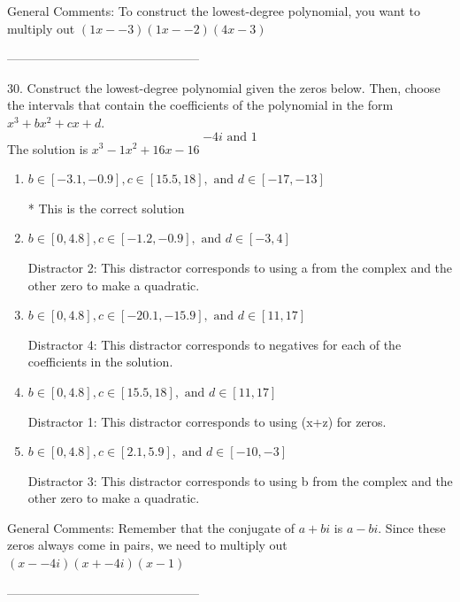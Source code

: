 \documentclass{article}[10pt]
\begin{document}
General Comments: To construct the lowest-degree polynomial, you want to multiply out $(1x--3)(1x--2)(4x-3)$

-----------------------------------------------

30. Construct the lowest-degree polynomial given the zeros below. Then, choose the intervals that contain the coefficients of the polynomial in the form $x^3+bx^2+cx+d$.
$$ -4i \text{ and } 1 $$ 
The solution is $ x^3 - 1 x^2 + 16 x - 16 $ 

\begin{enumerate}[label=\Alph*.] 
\item $ b \in [-3.1, -0.9], c \in [15.5, 18], \text{ and } d \in [-17, -13] $ 

 * This is the correct solution 
\item $ b \in [0, 4.8], c \in [-1.2, -0.9], \text{ and } d \in [-3, 4] $ 

  Distractor 2: This distractor corresponds to using a from the complex and the other zero to make a quadratic. 
\item $ b \in [0, 4.8], c \in [-20.1, -15.9], \text{ and } d \in [11, 17] $ 

  Distractor 4: This distractor corresponds to negatives for each of the coefficients in the solution. 
\item $ b \in [0, 4.8], c \in [15.5, 18], \text{ and } d \in [11, 17] $ 

  Distractor 1: This distractor corresponds to using (x+z) for zeros. 
\item $ b \in [0, 4.8], c \in [2.1, 5.9], \text{ and } d \in [-10, -3] $ 

  Distractor 3: This distractor corresponds to using b from the complex and the other zero to make a quadratic. 
\end{enumerate} 
 
General Comments: Remember that the conjugate of $a+bi$ is $a-bi$. Since these zeros always come in pairs, we need to multiply out $(x--4i)(x+-4i)(x-1)$

-----------------------------------------------
\end{document}
